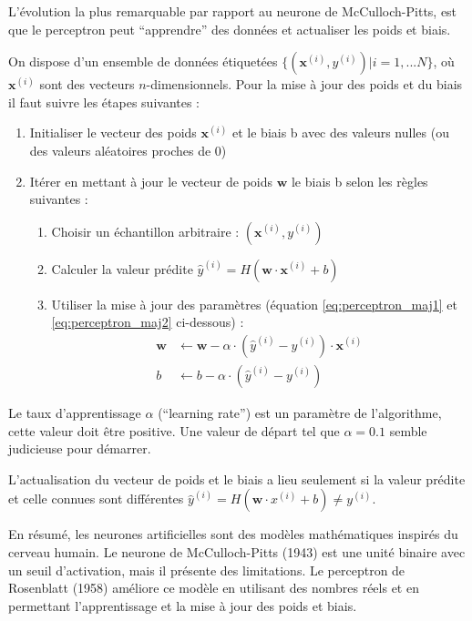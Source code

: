 \par{L'évolution la plus remarquable par rapport au neurone de McCulloch-Pitts, est que le perceptron peut ``apprendre'' des données et actualiser les poids et biais.}
\par{On dispose d'un ensemble de données étiquetées $\{(\bm{x}^{(i)}, y^{(i)})| i = 1, ... N\}$, où $\bm{x}^{(i)}$ sont des vecteurs $n$-dimensionnels. Pour la mise à jour des poids et du biais il faut suivre les étapes suivantes :}
\begin{enumerate}
    \item Initialiser le vecteur des poids $\bm{x}^{(i)}$ et le biais b avec des valeurs nulles (ou des valeurs aléatoires proches de 0)
    \item Itérer en mettant à jour le vecteur de poids $\bm{w}$ le biais b selon les règles suivantes :
    \begin{enumerate}
        \item Choisir un échantillon arbitraire : $(\bm{x}^{(i)}, y^{(i)})$
        \item Calculer la valeur prédite $\hat{y}^{(i)} = H(\bm{w} \cdot \bm{x}^{(i)} + b)$
        \item Utiliser la mise à jour des paramètres (équation \ref{eq:perceptron_maj1} et \ref{eq:perceptron_maj2} ci-dessous) :
        \vspace{20pt}
        \begin{align}
            \bm{w} &\leftarrow \bm{w} - \alpha \cdot (\hat{y}^{(i)} - y^{(i)}) \cdot \bm{x}^{(i)}
            \label{eq:perceptron_maj1}\\
            b &\leftarrow b - \alpha \cdot (\hat{y}^{(i)} - y^{(i)})
            \label{eq:perceptron_maj2}
        \end{align}
    \end{enumerate}
\end{enumerate}

Le taux d'apprentissage $\alpha$ (``learning rate'') est un paramètre de l'algorithme, cette valeur doit être positive. Une valeur de départ tel que $\alpha = 0.1$ semble judicieuse pour démarrer.

L'actualisation du vecteur de poids et le biais a lieu seulement si la valeur prédite et celle connues sont différentes $\hat{y}^{(i)} = H(\bm{w} \cdot x^{(i)} + b) \neq y^{(i)}$.

En résumé, les neurones artificielles sont des modèles mathématiques inspirés du cerveau humain. Le neurone de McCulloch-Pitts (1943) est une unité binaire avec un seuil d'activation, mais il présente des limitations. Le perceptron de Rosenblatt (1958) améliore ce modèle en utilisant des nombres réels et en permettant l'apprentissage et la mise à jour des poids et biais.

